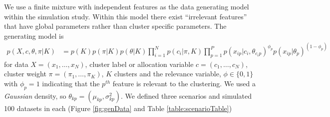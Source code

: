 \documentclass[12pt]{article}
\begin{document}
We use a finite mixture with independent features as the data generating model within the simulation study.
Within this model there exist ``irrelevant features'' \citep{law2003feature} that have global parameters rather than cluster specific parameters. 
The generating model is
\begin{align*}
	p(X, c, \theta, \pi| K) &= p(K) p(\pi| K) p(\theta|K) \prod_{i=1}^N p (c_i | \pi, K)  \prod_{p=1}^P p(x_{ip} | c_i, \theta_{c_ip})^ {\phi_p} p(x_{ip} | \theta_p) ^ {(1 - \phi_p)}
\end{align*}
for data $X=(x_1, \ldots, x_N)$, cluster label or allocation variable $c=(c_1, \ldots, c_N)$, cluster weight $\pi=(\pi_1, \ldots, \pi_K)$, $K$ clusters and the relevance variable, $\phi \in \{0, 1\}$ with $\phi_p=1$ indicating that the $p^{th}$ feature is relevant to the clustering. We used a \emph{Gaussian} density, so $\theta_{kp} = (\mu_{kp}, \sigma^2_{kp})$. We defined three scenarios and simulated 100 datasets in each (Figure \ref{fig:genData} and Table \ref{table:scenarioTable}) 
\end{document}
